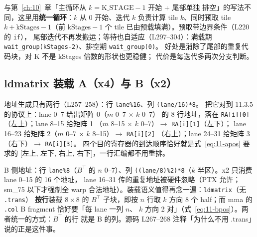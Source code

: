 

与第~\ref{ch:10}~章「主循环从 $k{=}\mathrm{K\_STAGE}{-}1$ 开始 + 尾部单独
排空」的写法不同，这里用\textbf{统一循环}：$k$ 从 0 开始、迭代 $k$ 负责计算
tile $k$、同时预取 tile $k+\mathrm{kStages}-1$（前 $\mathrm{kStages}{-}1$
个 tile 已由预载填满）。预取带边界条件（L220 的 \texttt{if}），
尾部迭代不再发搬运；等待也自适应（L297--304）：满载期
\texttt{wait\_\allowbreak{}group\allowbreak{}(k\allowbreak{}Stages-2)}、排空期 \texttt{wait\_\allowbreak{}group\allowbreak{}(0)}。
好处是消除了尾部的重复代码块，对 K 不是 kStages 倍数的形状也更稳健；
代价是每迭代多两次分支判断。

\subsection{ldmatrix 装载 A（x4）与 B（x2）}



地址生成只有两行（L257--258）：行 \texttt{lane\%16}、列 \texttt{(lane/16)*8}。
把它对到 11.3.5 的协议上：lane 0--7 给出矩阵 0（$m$ 0--7 $\times$ $k$ 0--7）
的 8 行地址，落在 \texttt{RA[i][0]}（左上）；lane 8--15 给矩阵 1
（$m$ 8--15 $\times$ $k$ 0--7）$\to$ \texttt{RA[i][1]}（左下）；
lane 16--23 给矩阵 2（$m$ 0--7 $\times$ $k$ 8--15）$\to$ \texttt{RA[i][2]}
（右上）；lane 24--31 给矩阵 3（右下）$\to$ \texttt{RA[i][3]}。
四个目的寄存器的到达顺序恰好就是式~\ref{eq:11-apos} 要求的
[左上, 左下, 右上, 右下]，一行汇编都不用重排。



B 侧地址：行 \texttt{lane\%8}（$B^{\top}$ 的 $n$ 0--7）、列
\texttt{\allowbreak{}(\allowbreak{}(lane/\allowbreak{}8)\%2)*8}（$k$ 半区）。x2 只消费 lane 0--15 的 16 个地址，
lane 16--31 传的重复地址被硬件忽略（PTX 允许；sm\_75 以下才强制全 warp
合法地址）。装载语义值得再念一遍：\texttt{ldmatrix}（无 \texttt{.trans}）
\textbf{按行}装载 $8\times8$ 的 $B^{\top}$ 子块，即按 $n$ 行取 $k$ 方向
8 个 half；而 mma 的 \texttt{.col} B fragment 恰好要「每 lane 一列 $n$、
$k$ 方向 2 对」（式~\ref{eq:11-bpos}）。两者统一的方式：$B^{\top}$ 的行
就是 B 的列。源码 L267--268 注释「为什么不用 .trans」说的正是这件事。

